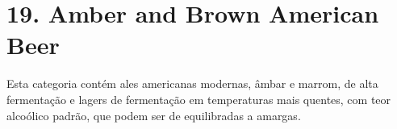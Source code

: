 \section*{19. Amber and Brown American Beer}

Esta categoria contém ales americanas modernas, âmbar e marrom, de alta fermentação e lagers de fermentação em temperaturas mais quentes, com teor alcoólico padrão, que podem ser de equilibradas a amargas.
